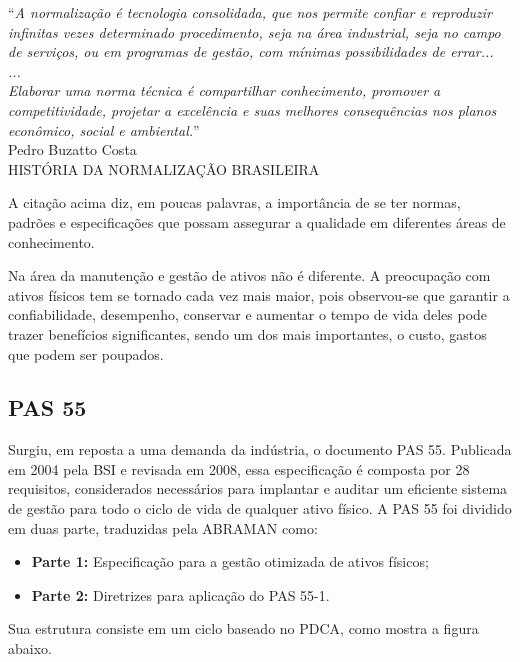 \begin{flushright}
	“\textit{A normalização é tecnologia consolidada, que nos
permite confiar e reproduzir infinitas vezes determinado
procedimento, seja na área industrial, seja no campo de
serviços, ou em programas de gestão, com mínimas
possibilidades de errar...
\\
...
\\
Elaborar uma norma técnica é compartilhar
conhecimento, promover a competitividade, projetar a
excelência e suas melhores consequências nos planos
econômico, social e ambiental.}”
\\
Pedro Buzatto Costa
\\
HISTÓRIA DA NORMALIZAÇÃO BRASILEIRA
\end{flushright}

A citação acima diz, em poucas palavras, a importância de se ter normas, padrões e especificações que possam assegurar a qualidade em diferentes áreas de conhecimento.

Na área da manutenção e gestão de ativos não é diferente. A preocupação com ativos físicos tem se tornado cada vez mais maior, pois observou-se que garantir a confiabilidade, desempenho, conservar e aumentar o tempo de vida deles pode trazer benefícios significantes, sendo um dos mais importantes, o custo, gastos que podem ser poupados.

\subsection{PAS 55}
\label{pas55}

Surgiu, em reposta a uma demanda da indústria, o documento PAS 55. Publicada em 2004 pela BSI e revisada em 2008, essa especificação é composta por 28 requisitos, considerados necessários para implantar e auditar um eficiente sistema de gestão para todo o ciclo de vida de qualquer ativo físico. A PAS 55 foi dividido em duas parte, traduzidas pela ABRAMAN como:

\begin{itemize}
	\item \textbf{Parte 1:} Especificação para a gestão otimizada de ativos físicos;
	\item \textbf{Parte 2:} Diretrizes para aplicação do PAS 55-1. 
\end{itemize} 

Sua estrutura consiste em um ciclo baseado no PDCA, como mostra a figura abaixo.

